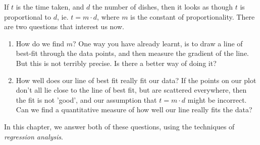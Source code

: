 If $t$ is the time taken, and $d$ the number of dishes, then it looks as though $t$ is proportional to $d$, ie. $t=m\cdot d$, where $m$ is the constant of proportionality. There are two questions that interest us now.
\begin{enumerate}
\item How do we find $m$? One way you have already learnt, is to draw a line of best-fit through the data points, and then measure the gradient of the line. But this is not terribly precise. Is there a better way of doing it?
\item How well does our line of best fit really fit our data?  If the points on our plot don't all lie close to the line of best fit, but are scattered everywhere, then the fit is not 'good', and our assumption that $t=m\cdot d$ might be incorrect. Can we find a quantitative measure of how well our line really fits the data?
\end{enumerate}
In this chapter, we answer both of these questions, using the techniques of \emph{regression analysis}.

